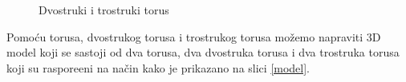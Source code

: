 \documentclass[a4paper,12pt]{article}
\theoremstyle{zad}
\begin{document}
\begin{figure}[!h]
\centering
{}\hspace*{0.5cm}
\hspace*{0.5cm}
\caption{Dvostruki i trostruki torus}
\end{figure}
\noindent Pomo\'cu torusa, dvostrukog torusa i trostrukog torusa možemo napraviti 3D model koji se sastoji od dva torusa, dva dvostruka torusa i dva tro\-stru\-ka torusa koji su raspore\dj eni na na\v{c}in kako je prikazano na slici \ref{model}.

\newpage
\end{document}
